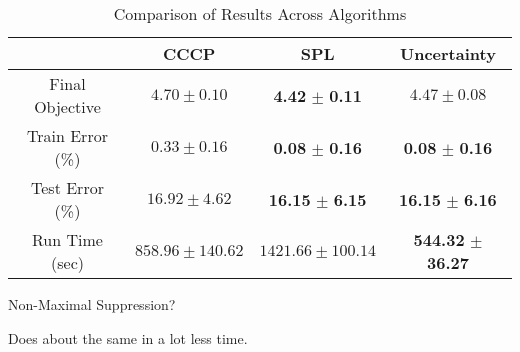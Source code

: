 \documentclass[12pt]{article}
\begin{document}
\begin{table}
\caption{Comparison of Results Across Algorithms}
\begin{center}
\begin{tabular}{|c|c|c|c|}
\hline  & CCCP & SPL & Uncertainty \\\hline
Final Objective & $4.70 \pm 0.10$ & \textbf{4.42} $\pm$ \textbf{0.11} & $4.47 \pm 0.08$ \\\hline
Train Error (\%) & $0.33 \pm 0.16$ & \textbf{0.08} $\pm$ \textbf{0.16} & \textbf{0.08} $\pm$ \textbf{0.16}  \\ \hline
Test Error (\%) & $16.92 \pm 4.62$ & \textbf{16.15} $\pm$ \textbf{6.15} & \textbf{16.15} $\pm$ \textbf{6.16} \\ \hline
Run Time (sec) & $858.96 \pm 140.62$ & $1421.66 \pm 100.14$ & \textbf{544.32} $\pm$ \textbf{36.27} \\ \hline
\end{tabular}
\end{center}
\end{table}

Non-Maximal Suppression?

Does about the same in a lot less time.
\end{document}

